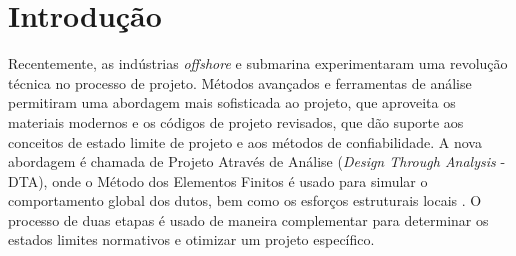 \section{Introdução}

Recentemente, as indústrias \textit{offshore} e submarina experimentaram uma revolução técnica no processo de projeto. Métodos avançados e ferramentas de análise permitiram uma abordagem mais sofisticada ao projeto, que aproveita os materiais modernos e os códigos de projeto revisados, que dão suporte aos conceitos de estado limite de projeto e aos métodos de confiabilidade. A nova abordagem é chamada de Projeto Através de Análise (\textit{Design Through Analysis} - DTA), onde o Método dos Elementos Finitos é usado para simular o comportamento global dos dutos, bem como os esforços estruturais locais
. O processo de duas etapas é usado de maneira complementar para determinar os estados limites normativos e otimizar um projeto específico.